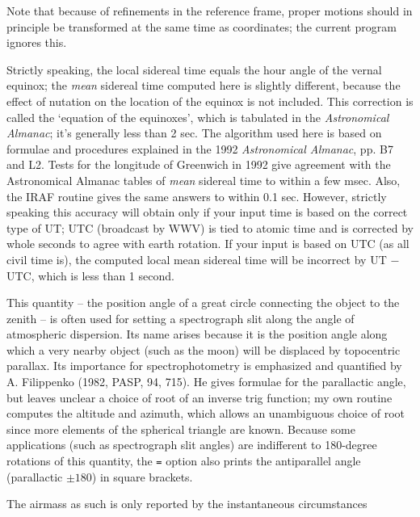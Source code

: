 Note that because of refinements in the reference frame, 
proper motions should in principle be transformed at the same time as
coordinates; the current
program ignores this.
\par
{}
\par
Strictly speaking, the local sidereal time equals the hour angle of the 
vernal equinox; the {\it mean} sidereal time computed here is slightly 
different, because the effect of nutation on the location of the equinox 
is not included.  This correction is called the `equation of the equinoxes', 
which is tabulated in the {\it Astronomical Almanac}; it's generally 
less than 2 sec. The algorithm used here is based on formulae and 
procedures explained in the 1992  {\it Astronomical Almanac}, pp. B7 and L2.
Tests for the longitude of Greenwich in 1992 give agreement with the 
Astronomical Almanac tables of {\it mean} sidereal time to within a few msec. 
Also, the IRAF routine gives the same answers to within 0.1 sec.  However,
strictly speaking this accuracy will obtain only if your input time is based 
on the correct type of UT; UTC (broadcast by WWV) is tied to atomic time
and is corrected by whole seconds to agree with earth rotation.  If your 
input is based on UTC (as all civil time is), the computed local mean 
sidereal time will be incorrect by UT $-$ UTC, which is less than 1 second.
\par
{}
\par
This quantity -- the position angle of a great circle connecting the
object to the zenith -- is often used for setting a spectrograph
slit along the angle of atmospheric dispersion.  Its name arises because
it is the position angle along which a very nearby object (such as the
moon) will be displaced by topocentric parallax.  Its importance for
spectrophotometry is emphasized and quantified
by A. Filippenko (1982, PASP, 94, 715).  He gives formulae 
for the parallactic angle, but leaves unclear a 
choice of root of an inverse trig function; my own routine 
computes the altitude and azimuth, which allows an unambiguous choice 
of root since more elements of the spherical triangle are known.
Because some applications (such as spectrograph slit angles) are 
indifferent to 180-degree rotations of this quantity, the {\tt =} option
also prints the antiparallel angle (parallactic $\pm 180$) in square brackets.
\par
{}
\par
The airmass as such is only reported by the instantaneous circumstances
